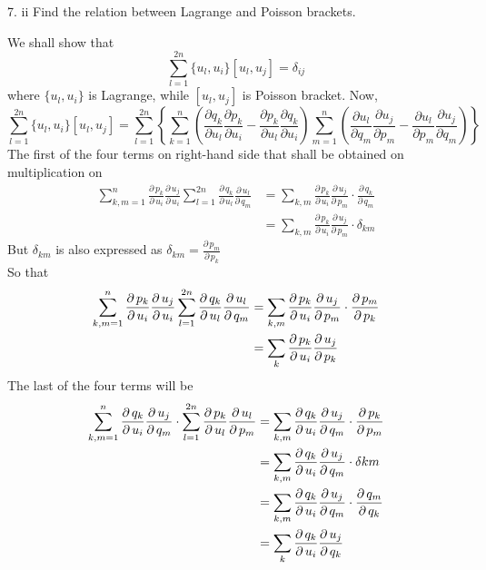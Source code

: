 \documentclass[12pt]{article}
\newcommand{\parr}[2]{\frac{\partial \,#1}{\partial \,#2}}
\begin{document}
\begin{prob}{7. ii}
    Find the relation between Lagrange and Poisson brackets.
\end{prob}
\begin{soln}
    We shall show that
    \[\sum_{l=1}^{2n} \{u_l,u_i\}[u_l,u_j]=\delta_{ij}\]
    where \(\{u_l,u_i\}\) is Lagrange, while \([u_l,u_j]\) is Poisson bracket. Now,
    \begin{equation}
        \sum_{l=1}^{2n} \{u_l,u_i\}[u_l,u_j]=\sum_{l=1}^{2n} \left\{ 
            \sum_{k=1}^{n} \left( \frac{\partial q_k}{\partial u_l}\frac{\partial p_k}{\partial u_i}-\frac{\partial p_k}{\partial u_l} \frac{\partial q_k}{\partial u_i}\right)
            \sum_{m=1}^n \left( \frac{\partial u_l}{\partial q_m}\frac{\partial u_j}{\partial p_m}-\frac{\partial u_l}{\partial p_m} \frac{\partial u_j}{\partial q_m}\right)
            \right\}\label{eq:7.2.1}
        \end{equation}
    The first of the four terms on right-hand side that shall be obtained on multiplication on
    \begin{align*}
        \sum_{k,m=1}^n\parr{p_k}{u_i}\parr{u_j}{u_i}\sum_{l=1}^{2n}\parr{q_k}{u_l}\parr{u_l}{q_m}&=\sum_{k,m} \parr{p_k}{u_i}\parr{u_j}{p_m}\cdot\parr{q_k}{q_m}\\
        &=\sum_{k,m} \parr{p_k}{u_i}\parr{u_j}{p_m}\cdot\delta_{km}
    \end{align*}
    But \(\delta_{km}\) is also expressed as \(\delta_{km}=\parr{p_m}{p_k}\)\\
    So that
    \begin{align}
        \sum_{k,m=1}^n\parr{p_k}{u_i}\parr{u_j}{u_i}\sum_{l=1}^{2n}\parr{q_k}{u_l}\parr{u_l}{q_m}&=\sum_{k,m} \parr{p_k}{u_i}\parr{u_j}{p_m}\cdot\parr{p_m}{p_k}\notag\\
        &=\sum_{k} \parr{p_k}{u_i}\parr{u_j}{p_k}\label{eq:7.2.2}
    \end{align}
    The last of the four terms will be
    \begin{align}
    \sum_{k,m=1}^{n}\parr{q_k}{u_i}\parr{u_j}{q_m}\cdot\sum_{l=1}^{2n}\parr{p_k}{u_l}\parr{u_l}{p_m}&=\sum_{k,m}\parr{q_k}{u_i}\parr{u_j}{q_m}\cdot\parr{p_k}{p_m}\notag\\
    &=\sum_{k,m}\parr{q_k}{u_i}\parr{u_j}{q_m}\cdot\delta{km}\notag\\
    &=\sum_{k,m}\parr{q_k}{u_i}\parr{u_j}{q_m}\cdot\parr{q_m}{q_k}\notag\\
    &=\sum_{k}\parr{q_k}{u_i}\parr{u_j}{q_k}\label{eq:7.2.3}
    \end{align}

\end{soln}
\end{document}
